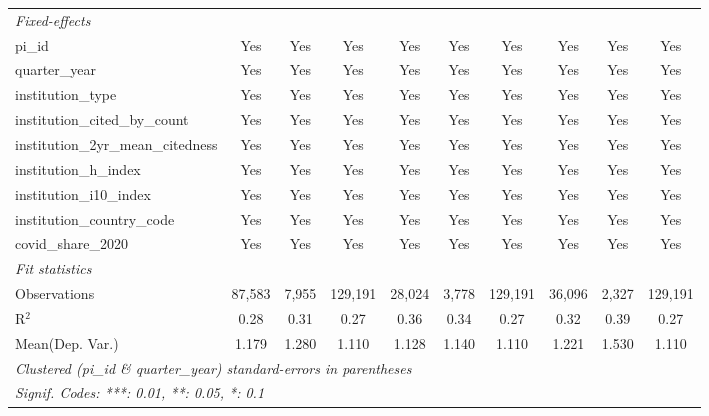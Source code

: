 \begin{tabular}{lccccccccc}
   \midrule
   \emph{Fixed-effects}\\
   pi\_id                                                      & Yes           & Yes            & Yes           & Yes           & Yes           & Yes           & Yes           & Yes            & Yes\\  
   quarter\_year                                               & Yes           & Yes            & Yes           & Yes           & Yes           & Yes           & Yes           & Yes            & Yes\\  
   institution\_type                                           & Yes           & Yes            & Yes           & Yes           & Yes           & Yes           & Yes           & Yes            & Yes\\  
   institution\_cited\_by\_count                               & Yes           & Yes            & Yes           & Yes           & Yes           & Yes           & Yes           & Yes            & Yes\\  
   institution\_2yr\_mean\_citedness                           & Yes           & Yes            & Yes           & Yes           & Yes           & Yes           & Yes           & Yes            & Yes\\  
   institution\_h\_index                                       & Yes           & Yes            & Yes           & Yes           & Yes           & Yes           & Yes           & Yes            & Yes\\  
   institution\_i10\_index                                     & Yes           & Yes            & Yes           & Yes           & Yes           & Yes           & Yes           & Yes            & Yes\\  
   institution\_country\_code                                  & Yes           & Yes            & Yes           & Yes           & Yes           & Yes           & Yes           & Yes            & Yes\\  
   covid\_share\_2020                                          & Yes           & Yes            & Yes           & Yes           & Yes           & Yes           & Yes           & Yes            & Yes\\  
   \midrule
   \emph{Fit statistics}\\
   Observations                                                & 87,583        & 7,955          & 129,191       & 28,024        & 3,778         & 129,191       & 36,096        & 2,327          & 129,191\\  
   R$^2$                                                       & 0.28          & 0.31           & 0.27          & 0.36          & 0.34          & 0.27          & 0.32          & 0.39           & 0.27\\  
Mean(Dep. Var.) & 1.179 & 1.280 & 1.110 & 1.128 & 1.140 & 1.110 & 1.221 & 1.530 & 1.110 \\
   \midrule \midrule
   \multicolumn{10}{l}{\emph{Clustered (pi\_id \& quarter\_year) standard-errors in parentheses}}\\
   \multicolumn{10}{l}{\emph{Signif. Codes: ***: 0.01, **: 0.05, *: 0.1}}\\
\end{tabular}
\par\endgroup

